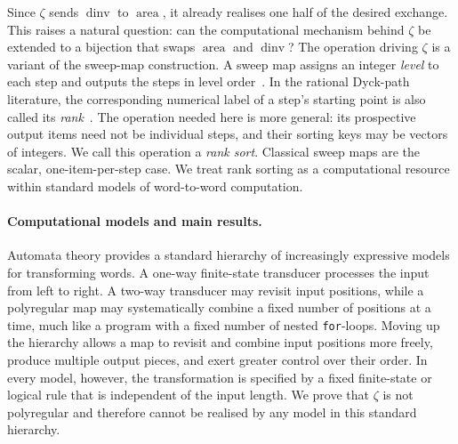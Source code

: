 \documentclass[11pt]{article}
\theoremstyle{definition}
\newcommand{\area}{\operatorname{area}}
\newcommand{\dinv}{\operatorname{dinv}}
\begin{document}
Since $\zeta$ sends $\dinv$ to $\area$, it already realises one half of the
desired exchange.  This raises a natural question: can the computational
mechanism behind $\zeta$ be extended to a bijection that swaps $\area$ and
$\dinv$?  The operation driving $\zeta$ is a variant of the sweep-map
construction.  A sweep map assigns an integer \emph{level} to each step and
outputs the steps in level order~\cite{ArmstrongLoehrWarrington2015,
ArmstrongLoehrWarrington2016}.  In the rational Dyck-path literature, the
corresponding numerical label of a step's starting point is also called its
\emph{rank}~\cite{Xin2015}.  The operation needed here is more general: its
prospective output items need not be individual steps, and their sorting keys
may be vectors of integers.  We call this operation a \emph{rank sort}.
Classical sweep maps are the scalar, one-item-per-step case.  We treat rank
sorting as a computational resource within standard models of word-to-word
computation.

\paragraph{Computational models and main results.}

Automata theory provides a standard hierarchy of increasingly expressive
models for transforming words.  A one-way finite-state transducer processes
the input from left to right.  A two-way transducer may revisit input
positions, while a polyregular map may systematically combine a fixed number
of positions at a time, much like a program with a fixed number of nested
\texttt{for}-loops.  Moving up the hierarchy allows a map to revisit and
combine input positions more freely, produce multiple output pieces, and exert
greater control over their order.  In every model, however, the transformation
is specified by a fixed
finite-state or logical rule that is independent of the input length.  We
prove that $\zeta$ is not polyregular and therefore cannot be realised by any
model in this standard hierarchy.
\end{document}
